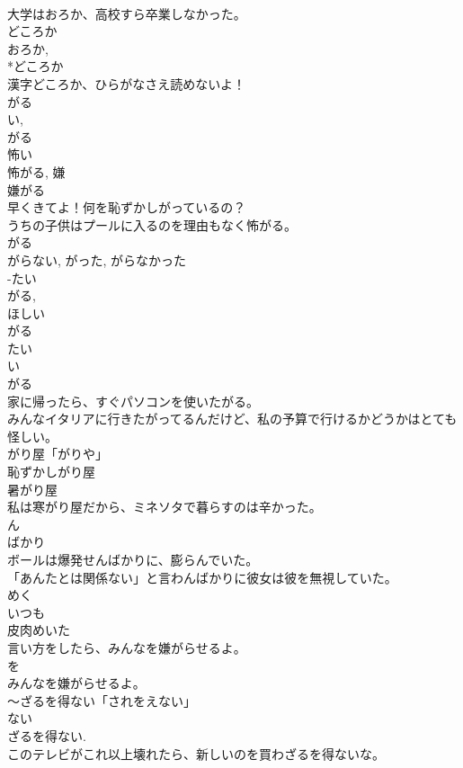 \documentclass[8pt]{extreport}
\begin{document}
\begin{CJK}{UTF8}{min}
\\	大学はおろか、高校すら卒業しなかった。
\\	どころか	
\\	おろか, 
\\	*どころか 
\\	漢字どころか、ひらがなさえ読めないよ！
\\	がる	
\\	い, 
\\	がる 
\\	怖い 
\\	怖がる,  嫌 
\\	嫌がる 
\\	早くきてよ！何を恥ずかしがっているの？
\\	うちの子供はプールに入るのを理由もなく怖がる。
\\	がる 
\\	がらない, がった, がらなかった	
\\	-たい 
\\	がる, 
\\	ほしい 
\\	がる	
\\	たい 
\\	い 
\\	がる 
\\	家に帰ったら、すぐパソコンを使いたがる。
\\	みんなイタリアに行きたがってるんだけど、私の予算で行けるかどうかはとても怪しい。
\\	がり屋「がりや」	
\\	恥ずかしがり屋
\\	暑がり屋 
\\	私は寒がり屋だから、ミネソタで暮らすのは辛かった。
\\	ん 
\\	ばかり	
\\	ボールは爆発せんばかりに、膨らんでいた。
\\	「あんたとは関係ない」と言わんばかりに彼女は彼を無視していた。
\\	めく	
\\	いつも
\\	皮肉めいた
\\	言い方をしたら、みんなを嫌がらせるよ。
\\	を 
\\	みんなを嫌がらせるよ。
\\	～ざるを得ない「されをえない」	
\\	ない 
\\	ざるを得ない. 
\\	このテレビがこれ以上壊れたら、新しいのを買わざるを得ないな。

\end{CJK}
\end{document}
